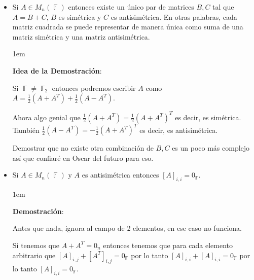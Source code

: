 \documentclass[12pt, fleqn]{report}                             %
\newenvironment{SmallIndentation}[1][0.75em]                    %
        {\begin{adjustwidth}{#1}{}\begin{footnotesize}}             %
        {\end{footnotesize}\end{adjustwidth}}                       %
\theoremstyle{break}                                            %
\DeclareMathOperator \GenericField {\mathbb{F}}                 %
\begin{document}
\begin{itemize}
\begin{SmallIndentation}[1em]
                            \end{SmallIndentation}

                        \clearpage

                        \item Si $A \in M_{n}(\GenericField)$ entonces existe un único par de matrices $B,C$
                            tal que $A = B + C$, $B$ es simétrica y $C$ es antisimétrica. 
                            En otras palabras, cada matriz cuadrada se puede representar de manera única
                            como suma de una matriz simétrica y una matriz antisimétrica.

                            \begin{SmallIndentation}[1em]
                                \textbf{Idea de la Demostración}:

                                Si $\GenericField \neq \GenericField_2$ entonces podremos escribir $A$ como
                                $A = \frac{1}{2}(A + A^T) + \frac{1}{2}(A - A^T)$.

                                Ahora algo genial que $\frac{1}{2}(A + A^T)=\frac{1}{2}(A + A^T)^T$ es
                                decir, es simétrica.
                                También $\frac{1}{2}(A - A^T)=-\frac{1}{2}(A + A^T)^T$ es decir, es
                                antisimétrica.

                                Demostrar que no existe otra combinación de $B,C$ es un poco más complejo
                                así que confiaré en Oscar del futuro para eso.

                            \end{SmallIndentation}

                        \item Si $A \in M_{n}(\GenericField)$ y $A$ es antisimétrica entonces 
                            $[A]_{i,i} = 0_{\GenericField}$.

                            \begin{SmallIndentation}[1em]
                                \textbf{Demostración}:

                                Antes que nada, ignora al campo de 2 elementos, en ese caso no funciona.

                                Si tenemos que $A + A^T = 0_{n}$ entonces tenemos que para cada
                                elemento arbitrario que $[A]_{i,j} + [A^T]_{i,j} = 0_{\GenericField}$
                                por lo tanto $[A]_{i,i} + [A]_{i,i} = 0_{\GenericField}$ por lo tanto 
                                $[A]_{i,i} = 0_{\GenericField}$.


\end{SmallIndentation}
\end{itemize}
\end{document}
